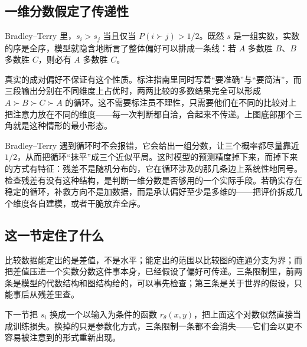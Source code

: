 \subsection{一维分数假定了传递性}

Bradley--Terry 里，\(s_i>s_j\) 当且仅当 \(P(i\succ j)>1/2\)。既然 \(s\) 是一组实数，实数的序是全序，模型就隐含地断言了整体偏好可以排成一条线：若 \(A\) 多数胜 \(B\)、\(B\) 多数胜 \(C\)，则必有 \(A\) 多数胜 \(C\)。

真实的成对偏好不保证有这个性质。标注指南里同时写着``要准确''与``要简洁''，而三段输出分别在不同维度上占优时，两两比较的多数结果完全可以形成 \(A\succ B\succ C\succ A\) 的循环。这不需要标注员不理性，只需要他们在不同的比较对上把注意力放在不同的维度——每一次判断都自洽，合起来不传递。上图底部那个三角就是这种情形的最小形态。

Bradley--Terry 遇到循环时不会报错，它会给出一组分数，让三个概率都尽量靠近 \(1/2\)，从而把循环``抹平''成三个近似平局。这时模型的预测精度掉下来，而掉下来的方式有特征：残差不是随机分布的，它在循环涉及的那几条边上系统性地同号。检查残差有没有这种结构，是判断一维分数是否够用的一个实际手段。若确实存在稳定的循环，补救方向不是加数据，而是承认偏好至少是多维的——把评价拆成几个维度各自建模，或者干脆放弃全序。

\subsection{这一节定住了什么}

比较数据能定出的是差值，不是水平；能定出的范围以比较图的连通分支为界；而把差值压进一个实数分数这件事本身，已经假设了偏好可传递。三条限制里，前两条是模型的代数结构和图结构给的，可以事先检查；第三条是关于世界的假设，只能事后从残差里查。

下一节把 \(s_i\) 换成一个以输入为条件的函数 \(r_\theta(x,y)\)，把上面这个对数似然直接当成训练损失。换掉的只是参数化方式，三条限制一条都不会消失——它们会以更不容易被注意到的形式重新出现。
